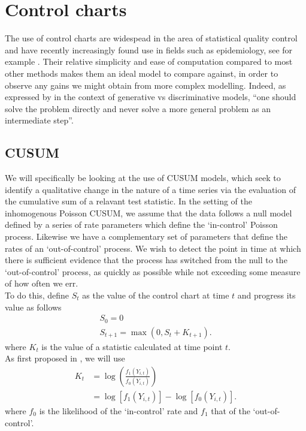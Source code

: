 \documentclass[11pt]{report}
\begin{document}
\chapter{Control charts}


The use of control charts are widespead in the area of statistical quality control and have recently increasingly found use in fields such as epidemiology, see for example \citet{mei}. Their relative simplicity and ease of computation compared to most other methods makes them an ideal model to compare against, in order to observe any gains we might obtain from more complex modelling. Indeed, as expressed by \citet{vapnik} in the context of generative vs discriminative models, ``one should solve the problem directly and never solve a more general problem as an intermediate step''. \\

\section{CUSUM}

We will specifically be looking at the use of CUSUM models, which seek to identify a qualitative change in the nature of a time series via the evaluation of the cumulative sum of a relavant test statistic. In the setting of the inhomogenous Poisson CUSUM, we assume that the data follows a null model defined by a series of rate parameters which define the `in-control' Poisson process. Likewise we have a complementary set of parameters that define the rates of an `out-of-control' process. We wish to detect the point in time at which there is sufficient evidence that the process has switched from the null to the `out-of-control' process, as quickly as possible while not exceeding some measure of how often we err. \\

To do this, define $S_t$ as the value of the control chart at time $t$ and progress its value as follows
\begin{gather}
S_0 = 0 \\
S_{t+1} = \max{(0, S_t + K_{t+1})}.
\end{gather}
where $K_t$ is the value of a statistic calculated at time point $t$. \\

As first proposed in \citet{page}, we will use
\begin{align}
K_t &= \log{\left(\frac{f_1(Y_{i,t})}{f_0(Y_{i,t})}\right)} \\
    &= \log{[f_1(Y_{i,t})]} - \log{[f_0(Y_{i,t})]}.
\end{align}
where $f_0$ is the likelihood of the `in-control' rate and $f_1$ that of the `out-of-control'. \\
\end{document}
